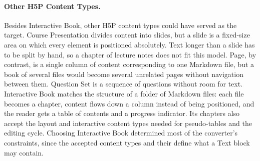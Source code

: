 \paragraph{Other H5P Content Types.}
Besides Interactive Book, other H5P content types could have served as the target.
Course Presentation divides content into slides, but a slide is a fixed-size area on which every
element is positioned absolutely.
Text longer than a slide has to be split by hand, so a chapter of
lecture notes does not fit this model.
Page, by contrast, is a single column of content corresponding to one Markdown file, but a book of several files would
become several unrelated pages without navigation between them.
Question Set is a sequence of questions without room for text.
Interactive Book matches the structure of a folder of Markdown files: each file becomes a chapter,
content flows down a column instead of being positioned, and the reader gets a table of contents and
a progress indicator.
Its chapters also accept the layout and interactive content types needed for pseudo-tables and the
editing cycle.
Choosing Interactive Book determined most of the converter's constraints, since the
accepted content types and their  define what a Text block may contain.
